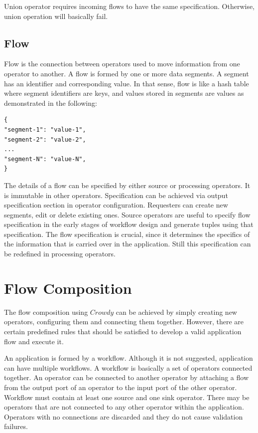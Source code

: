 Union operator requires incoming flows to have the same specification. Otherwise, 
union operation will basically fail.

\subsection{Flow}
Flow is the connection between operators used to move information from one operator 
to another. A flow is formed by one or more data segments. A segment has an identifier 
and corresponding value. In that sense, flow is like a hash table where segment identifiers 
are keys, and values stored in segments are values as demonstrated in the following:

\begin{lstlisting}
{
"segment-1": "value-1",
"segment-2": "value-2",
...
"segment-N": "value-N",
}
\end{lstlisting}

The details of a flow can be specified by either source or processing operators. It is 
immutable in other operators. Specification can be achieved via output specification section 
in operator configuration. Requesters can create new segments, edit or delete existing ones. 
Source operators are useful to specify flow specification in the early stages of workflow 
design and generate tuples using that specification. The flow specification is crucial, since 
it determines the specifics of the information that is carried over in the application. Still this 
specification can be redefined in processing operators.

\section{Flow Composition}
\label{sec:flow comp}
The flow composition using $Crowdy$ can be achieved by simply creating new 
operators, configuring them and connecting them together. However, there are certain 
predefined rules that should be satisfied to develop a valid application flow and execute it.

An application is formed by a workflow. Although it is not suggested, application can have 
multiple workflows. A workflow is basically a set of operators connected together. An operator 
can be connected to another operator by attaching a flow from the output port of an operator 
to the input port of the other operator. Workflow must contain at least one source and one 
sink operator. There may be operators that are not connected to any 
other operator within the application. Operators with no connections are discarded and 
they do not cause validation failures.


